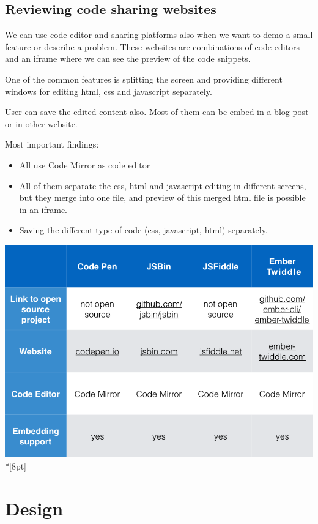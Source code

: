 \documentclass[12pt, a4paper, oneside, openright, medskipamount]{report}
\begin{document}
\section{Reviewing code sharing websites}

We can use code editor and sharing platforms also when we want to demo a small feature or describe a problem. These websites are combinations of code editors and an iframe where we can see the preview of the code snippets.

One of the common features is splitting the screen and providing different windows for editing html, css and javascript separately.

User can save the edited content also. Most of them can be embed in a blog post or in other website.

\noindent Most important findings:
\begin{itemize}[noitemsep]
\item All use Code Mirror as code editor
\item All of them separate the css, html and javascript editing in different screens, but they merge into one file, and preview of this merged html file is possible in an iframe.
\item Saving the different type of code (css, javascript, html) separately.
\end{itemize}

\newpage

\includegraphics[width=1\textwidth]{assets/code-sharing-website-review}\\*[8pt]

\chapter{Design}
\end{document}
